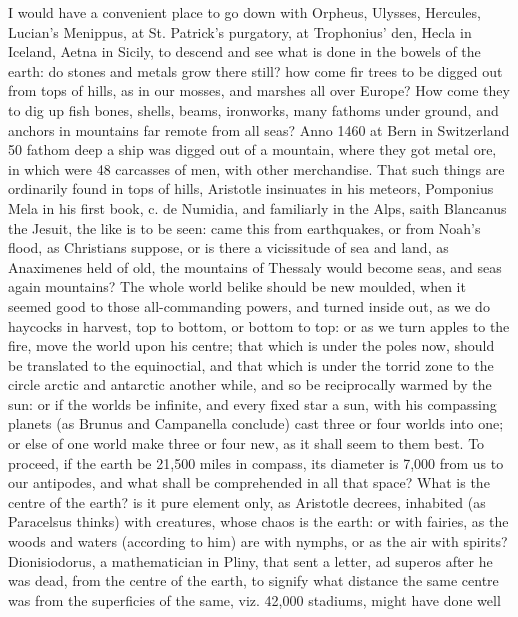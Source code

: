 {I would have a convenient place to go down with Orpheus, Ulysses,
Hercules, Lucian's Menippus, at St. Patrick's purgatory, at
Trophonius' den, Hecla in Iceland, Aetna in Sicily, to descend and see
what is done in the bowels of the earth: do stones and metals grow
there still? how come fir trees to be digged out from tops of
hills, as in our mosses, and marshes all over Europe? How come they to
dig up fish bones, shells, beams, ironworks, many fathoms under ground,
and anchors in mountains far remote from all seas? Anno 1460 at
Bern in Switzerland 50 fathom deep a ship was digged out of a mountain,
where they got metal ore, in which were 48 carcasses of men, with other
merchandise. That such things are ordinarily found in tops of hills,
Aristotle insinuates in his meteors, Pomponius Mela in his first
book, c. de Numidia, and familiarly in the Alps, saith Blancanus
the Jesuit, the like is to be seen: came this from earthquakes, or from
Noah's flood, as Christians suppose, or is there a vicissitude of sea
and land, as Anaximenes held of old, the mountains of Thessaly would
become seas, and seas again mountains? The whole world belike should be
new moulded, when it seemed good to those all-commanding powers, and
turned inside out, as we do haycocks in harvest, top to bottom, or
bottom to top: or as we turn apples to the fire, move the world upon
his centre; that which is under the poles now, should be translated to
the equinoctial, and that which is under the torrid zone to the circle
arctic and antarctic another while, and so be reciprocally warmed by
the sun: or if the worlds be infinite, and every fixed star a sun, with
his compassing planets (as Brunus and Campanella conclude) cast three
or four worlds into one; or else of one world make three or four new,
as it shall seem to them best. To proceed, if the earth be 21,500 miles
in compass, its diameter is 7,000 from us to our antipodes, and
what shall be comprehended in all that space? What is the centre of the
earth? is it pure element only, as Aristotle decrees, inhabited (as
 Paracelsus thinks) with creatures, whose chaos is the earth: or
with fairies, as the woods and waters (according to him) are with
nymphs, or as the air with spirits? Dionisiodorus, a mathematician in
Pliny, that sent a letter, ad superos after he was dead, from the
centre of the earth, to signify what distance the same centre was from
the superficies of the same, viz. 42,000 stadiums, might have done well
}
